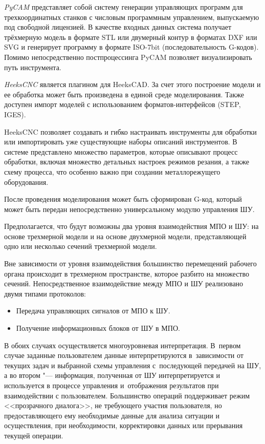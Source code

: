\textit{PyCAM} представляет собой систему генерации управляющих программ для трехкоординатных станков с числовым программным управлением, выпускаемую под свободной лицензией. В качестве входных данных система получает трёхмерную модель в формате STL или двумерный контур в форматах DXF или SVG и генерирует программу в формате ISO-7bit (последовательность G-кодов). Помимо непосредственно постпроцессинга PyCAM позволяет визуализировать путь инструмента.

\textit{HeeksCNC} является плагином для HeeksCAD. За счет этого построение модели и ее обработка может быть произведена в единой среде моделирования. Также доступен импорт моделей с использованием форматов-интерфейсов (STEP, IGES).

HeeksCNC позволяет создавать и гибко настраивать инструменты для обработки или импортировать уже существующие наборы описаний инструментов. В системе представлено множество параметров, которые описывают процесс обработки, включая множество детальных настроек режимов резания, а также схему процесса, что особенно важно при создании металлорежущего оборудования.

После проведения моделирования может быть сформирован G-код, который может быть передан непосредственно универсальному модулю управления ШУ.

Предполагается, что будут возможны два уровня взаимодействия \foreignlanguage{english}{МПО} и ШУ: на основе трехмерной модели и на основе двухмерной модели, представляющей одно или несколько сечений трехмерной модели.

Вне зависимости от уровня взаимодействия большинство перемещений рабочего органа происходит в трехмерном пространстве, которое разбито на множество сечений. Непосредственное взаимодействие между МПО и ШУ реализовано двумя типами протоколов:

\begin{itemize}
	\item Передача управляющих сигналов от МПО к ШУ.
	
	\item Получение информационных блоков от ШУ в МПО.
\end{itemize}


В обоих случаях осуществляется многоуровневая интерпретация. В~первом случае заданные пользователем данные интерпретируются в~зависимости от текущих задач и выбранной схемы управления с~последующей передачей на ШУ, а во втором "--- информация, полученная от ШУ интерпретируется и используется в процессе управления и~отображения результатов при взаимодействии с пользователем. Большинство операций поддерживает режим <<прозрачного диалога>>, не требующего участия пользователя, но предоставляющего ему необходимые данные для анализа ситуации и осуществления, при необходимости, корректировки данных или прерывания текущей операции.

